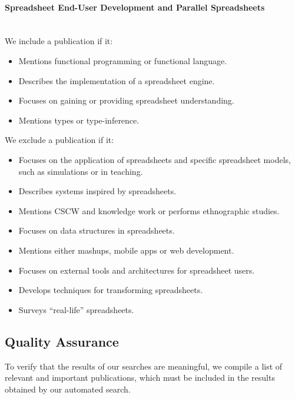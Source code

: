 \documentclass[a4paper]{article}
\begin{document}
\paragraph{Spreadsheet End-User Development and Parallel Spreadsheets}
~\\

We include a publication if it:

\begin{itemize}
\item Mentions functional programming or functional language.
\item Describes the implementation of a spreadsheet engine.
\item Focuses on gaining or providing spreadsheet understanding.
\item Mentions types or type-inference.
\end{itemize}

We exclude a publication if it:

\begin{itemize}
\item Focuses on the application of spreadsheets and specific
  spreadsheet models, such as simulations or in teaching.
\item Describes systems inspired by spreadsheets.
\item Mentions CSCW and knowledge work or performs ethnographic
  studies.
\item Focuses on data structures in spreadsheets.
\item Mentions either mashups, mobile apps or web development.
\item Focuses on external tools and architectures for spreadsheet
  users.
\item Develops techniques for transforming spreadsheets.
\item Surveys ``real-life'' spreadsheets.
\end{itemize}

\subsection{Quality Assurance}
\label{sec:quality-assurance}

To verify that the results of our searches are meaningful, we compile
a list of relevant and important publications, which must be included
in the results obtained by our automated search.
\end{document}
